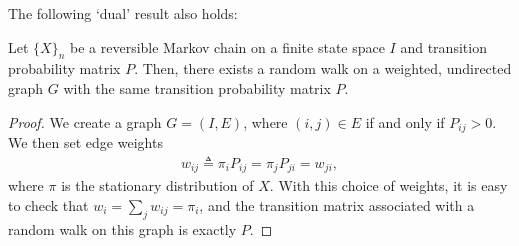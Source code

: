 \documentclass[a4paper,10pt,english]{article}
\begin{document}
%
%

The following `dual' result also holds:

\begin{lem} 
Let $\{X\}_n$ be a reversible Markov chain on a finite state space $I$ and transition probability matrix $P$. 
Then, there exists a random walk on a weighted, undirected graph $G$ with the same transition probability matrix $P$. 
\end{lem}
\begin{proof} 
We create a graph $G = (I,E)$, where $(i,j) \in E$ if and only if $P_{ij} > 0$. We then set edge weights 
\begin{align*}
w_{ij} \triangleq \pi_i P_{ij} = \pi_jP_{ji} = w_{ji},
\end{align*}
where $\pi$ is the stationary distribution of $X$. With this choice of weights, it is easy to check that $w_i = \sum_j w_{ij} = \pi_i$, and the transition matrix associated with a random walk on this graph is exactly $P$.
\end{proof}
\end{document}
